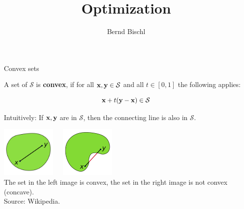 



\usepackage[export]{adjustbox}


\newcommand{\titlefigure}{figure_man/convex.png}
\newcommand{\learninggoals}{
\item Convex sets
\item Convex functions
}



\title{Optimization}
\author{Bernd Bischl}
\date{}



\sloppy




\begin{vbframe}{Convex sets}

A set of $\mathcal{S}$ is \textbf{convex}, if for all $\mathbf{x}, \mathbf{y} \in \mathcal{S}$ and all $t \in [0, 1]$ the following applies:

$$
\mathbf{x} + t (\mathbf{y} - \mathbf{x}) \in \mathcal{S}
$$

Intuitively: If $\mathbf{x}, \mathbf{y}$ are in $\mathcal{S}$, then the connecting line is also in $\mathcal{S}$.

\begin{center}
\includegraphics[width = 0.2\textwidth]{figure_man/convex.png}~~~\includegraphics[width = 0.2\textwidth]{figure_man/concave.png} \\
\footnotesize{The set in the left image is convex, the set in the right image is not convex (concave). \\
Source: Wikipedia. 
}
\end{center}

\end{vbframe}

